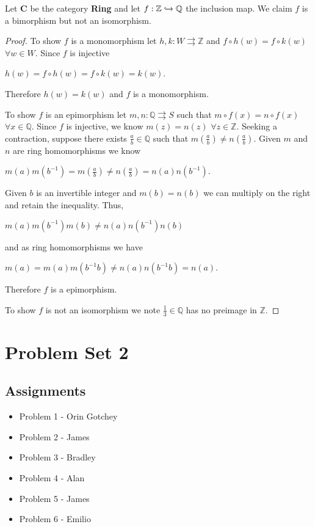\documentclass{article}
\newcommand{\Q}{\mathbb{Q}}
\newcommand{\Z}{\mathbb{Z}}
\begin{document}
	\vspace{2mm}
	
	\noindent Let \textbf{C} be the category \textbf{Ring} and let $f:\Z \xhookrightarrow[]{} \Q$ the inclusion map.
	We claim $f$ is a bimorphism but not an isomorphism.
	
	\begin{proof}
		To show $f$ is a monomorphism let $h,k:W \rightrightarrows \Z$ and $f\circ h(w)=f \circ k (w)$ $\forall w\in W$.
		Since $f$ is injective
		\begin{center}
			$h(w)=f\circ h(w)=f\circ k(w)=k(w)$.
		\end{center}
		Therefore $h(w)=k(w)$ and $f$ is a monomorphism.
		
		To show $f$ is an epimorphism let $m,n:\Q \rightrightarrows S$ such that $m\circ f(x)=n\circ f(x)$ $\forall x\in \Q$.
		Since $f$ is injective, we know $m(z)=n(z)$ $\forall z\in\Z$.
		Seeking a contraction, suppose there exists $\frac{a}{b}\in \Q$ such that $m(\frac{a}{b})\neq n(\frac{a}{b})$.
		Given $m$ and $n$ are ring homomorphisms we know
		\begin{center}
			$m(a)m(b^{-1})=m(\frac{a}{b}) \neq n(\frac{a}{b})=n(a)n(b^{-1})$.
		\end{center}
		Given $b$ is an invertible integer and $m(b)=n(b)$ we can multiply on the right and retain the inequality.
		Thus, 
		\begin{center}
			$m(a)m(b^{-1})m(b)\neq n(a)n(b^{-1})n(b)$
		\end{center} 
		and as ring homomorphisms we have
		\begin{center}
			$m(a)=m(a)m(b^{-1}b)\neq n(a)n(b^{-1}b)=n(a)$.
		\end{center}
		Therefore $f$ is a epimorphism.
		
		To show $f$ is not an isomorphism we note $\frac{1}{3}\in \Q$ has no preimage in $\Z$.
	\end{proof}
\section{Problem Set 2}
\subsection*{Assignments}
\begin{itemize}
	\item Problem 1 - Orin Gotchey
	\item Problem 2 - James
	\item Problem 3 - Bradley
	\item Problem 4 - Alan
	\item Problem 5 - James
	\item Problem 6 - Emilio
\end{itemize}
\end{document}
